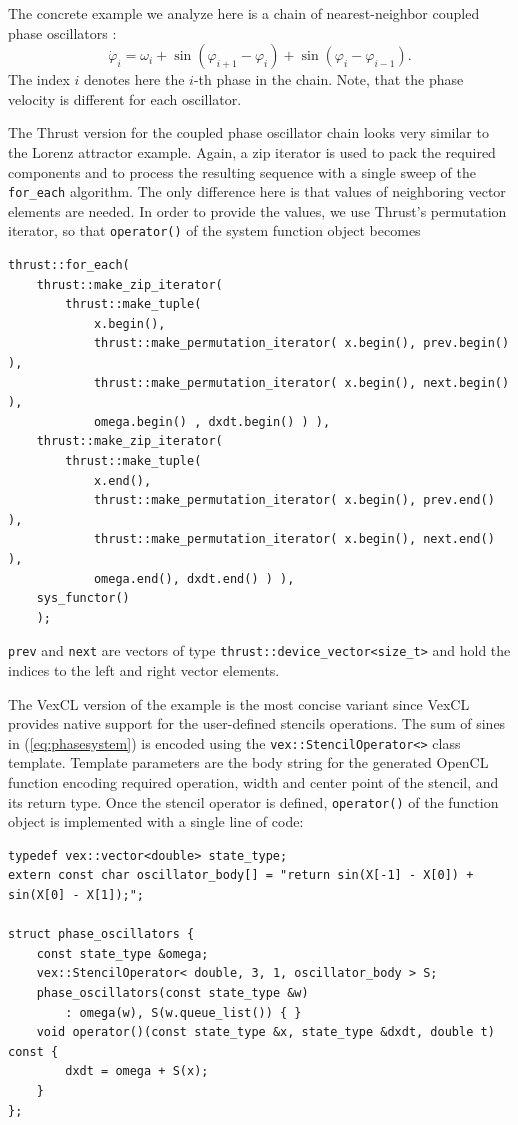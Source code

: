 \documentclass[final]{siamltex}
\newcommand{\code}[1]{\lstinline|#1|}
\newcommand{\eqref}[1]{(\ref{#1})}
\begin{document}


The concrete example we analyze here is a chain of nearest-neighbor
coupled phase oscillators \cite{Cohen-Rand-Holmes-82}:
\begin{equation} \label{eq:phasesystem}
    \dot{\varphi}_i = \omega_i + \sin( \varphi_{i+1} - \varphi_i) + \sin( \varphi_i
    - \varphi_{i-1}).
\end{equation}
The index $i$ denotes here the $i$-th phase in the chain. Note, that
the phase velocity is different for each oscillator.

The Thrust version for the coupled phase oscillator chain looks very similar to
the Lorenz attractor example. Again, a zip iterator is used to pack the required
components and to process the resulting sequence with a single sweep of the
\code{for_each} algorithm. The only difference here is that values of
neighboring vector elements are needed. In order to provide the values, we use Thrust's
permutation iterator, so that \code{operator()} of the system function object becomes
\begin{lstlisting}
thrust::for_each(
    thrust::make_zip_iterator(
        thrust::make_tuple(
            x.begin(),
            thrust::make_permutation_iterator( x.begin(), prev.begin() ),
            thrust::make_permutation_iterator( x.begin(), next.begin() ),
            omega.begin() , dxdt.begin() ) ),
    thrust::make_zip_iterator(
        thrust::make_tuple(
            x.end(),
            thrust::make_permutation_iterator( x.begin(), prev.end() ),
            thrust::make_permutation_iterator( x.begin(), next.end() ),
            omega.end(), dxdt.end() ) ),
    sys_functor()
    );
\end{lstlisting}
\code{prev} and \code{next} are vectors of type
\code{thrust::device_vector<size_t>} and hold the indices to the left and right
vector elements.

The VexCL version of the example is the most
concise variant since VexCL provides native support for the user-defined
stencils operations. The sum of sines in \eqref{eq:phasesystem} is encoded
using the \code{vex::StencilOperator<>} class template. Template parameters
are the body string for the generated OpenCL function encoding required
operation, width and center point of the stencil, and its return type. Once the
stencil operator is defined, \code{operator()} of the function object is implemented
with a single line of code:
\begin{lstlisting}
typedef vex::vector<double> state_type;
extern const char oscillator_body[] = "return sin(X[-1] - X[0]) + sin(X[0] - X[1]);";

struct phase_oscillators {
    const state_type &omega;
    vex::StencilOperator< double, 3, 1, oscillator_body > S;
    phase_oscillators(const state_type &w)
        : omega(w), S(w.queue_list()) { }
    void operator()(const state_type &x, state_type &dxdt, double t) const {
        dxdt = omega + S(x);
    }
};
\end{lstlisting}
\end{document}
